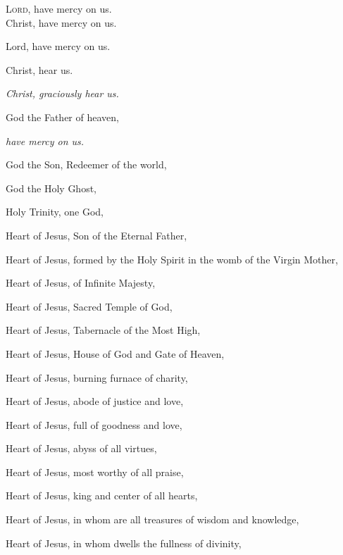 
\newHymn


\bigskip

\lettrine{L}{ord,} have mercy on us.\\
Christ, have mercy on us.

\pointorig

\begin{hangparas}{1em}{1}
\parskip0mm

Lord, have mercy on us.

Christ, hear us.

{\itshape Christ, graciously hear us.}

God the Father of heaven,

{\itshape have mercy on us.}

God the Son, Redeemer of the world,

God the Holy Ghost,

Holy Trinity, one God,

 Heart of Jesus, Son of the Eternal 
 Father, 

 Heart of Jesus, formed by the Holy Spirit
 in the womb of the Virgin Mother,


Heart of Jesus, of Infinite Majesty,

 Heart of Jesus, Sacred Temple of God, 

 Heart of Jesus, Tabernacle of the Most
 High,

Heart of Jesus, House of God and Gate of Heaven,
         
 Heart of Jesus, burning furnace of         
 charity,
          
 Heart of Jesus, abode of justice and        
 love,
             
 Heart of Jesus, full of goodness and
 love,
             
 Heart of Jesus, abyss of all virtues,
 
 Heart of Jesus, most worthy of all         
 praise, 

 Heart of Jesus, king and center of all     
 hearts,

 Heart of Jesus, in whom are all treasures  
 of wisdom and knowledge,

 Heart of Jesus, in whom dwells the         
 fullness of divinity,


\end{hangparas}
